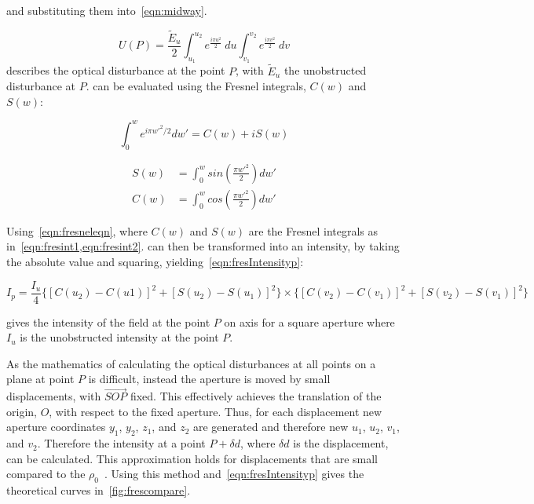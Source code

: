 and substituting them into~\cref{eqn:midway}.

\begin{equation}
U(P)=\frac{\tilde{E}_u}{2}\int_{u_1}^{u_2} e^{\tfrac{i\pi u^2}{2}}\ du\int_{v_1}^{v_2} e^{\tfrac{i\pi v^2}{2}} \ dv
\label{eqn:pentdisturb}
\end{equation}
 describes the optical disturbance at the point $P$, with $\tilde{E}_u$ the unobstructed disturbance at $P$.
 can be evaluated using the Fresnel integrals, $C(w)$ and $S(w)$:


\begin{equation}
\int_{0}^{w}e^{i\pi w'^2/2}dw'=C(w)+iS(w)
\label{eqn:fresneleqn}
\end{equation}


\begin{align}
S(w)&=\int^w_0 sin\left(\frac{\pi w'^2}{2}\right)dw'\label{eqn:fresint1}\\
C(w)&=\int^w_0 cos\left(\frac{\pi w'^2}{2}\right)dw'\label{eqn:fresint2}
\end{align}


Using~\cref{eqn:fresneleqn}, where $C(w)$ and $S(w)$ are the Fresnel integrals as in~\cref{eqn:fresint1,eqn:fresint2}.
 can then be transformed into an intensity, by taking the absolute value and squaring, yielding~\cref{eqn:fresIntensityp}:


\begin{equation}
I_p = \frac{I_u}{4} \{[C(u_2) - C(u1)]^2 + [S(u_2) - S(u_1)]^2\} \times \{[C(v_2) - C(v_1)]^2 + [S(v_2) - S(v_1)]^2\}
\label{eqn:fresIntensityp}
\end{equation}

 gives the intensity of the field at the point $P$ on axis for a square aperture where $I_u$ is the unobstructed intensity at the point $P$. 

\medskip

As the mathematics of calculating the optical disturbances at all points on a plane at point $P$ is difficult, instead the aperture is moved by small displacements, with $\overrightarrow{SOP}$ fixed.
This effectively achieves the translation of the origin, $O$, with respect to the fixed aperture. 
Thus, for each displacement new aperture coordinates $y_1$, $y_2$, $z_1$, and $z_2$ are generated and therefore new $u_1$, $u_2$, $v_1$, and $v_2$.
Therefore the intensity at a point $P +\delta d$, where $\delta d$ is the displacement, can be calculated.
This approximation holds for displacements that are small compared to the $\rho_0$~\cite{born2000principles,hecht2017optics,goodman2017introduction}.
Using this method and~\cref{eqn:fresIntensityp} gives the theoretical curves in~\cref{fig:frescompare}.

